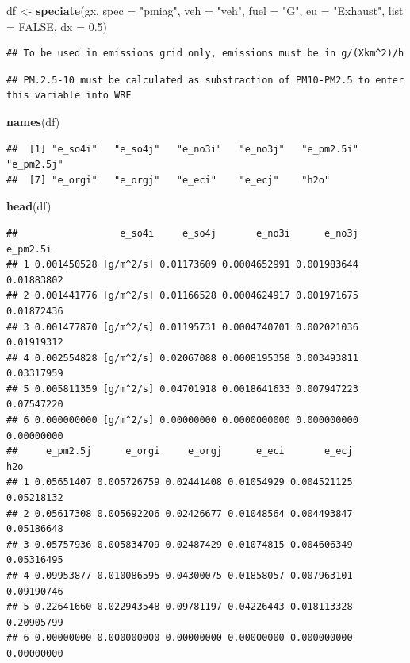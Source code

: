 \documentclass[12pt,graybox,envcountchap,sectrefs]{krantz}
\makeatletter
\newenvironment{Shaded}{\begin{snugshade}}{\end{snugshade}}
\newcommand{\KeywordTok}[1]{\textcolor[rgb]{0.13,0.29,0.53}{\textbf{#1}}}
\newcommand{\DataTypeTok}[1]{\textcolor[rgb]{0.13,0.29,0.53}{#1}}
\newcommand{\FloatTok}[1]{\textcolor[rgb]{0.00,0.00,0.81}{#1}}
\newcommand{\StringTok}[1]{\textcolor[rgb]{0.31,0.60,0.02}{#1}}
\newcommand{\OtherTok}[1]{\textcolor[rgb]{0.56,0.35,0.01}{#1}}
\newcommand{\NormalTok}[1]{#1}
\newenvironment{kframe}{%
\medskip{}
\setlength{\fboxsep}{.8em}
 \def\at@end@of@kframe{}%
 \ifinner\ifhmode%
  \def\at@end@of@kframe{\end{minipage}}%
  \begin{minipage}{\columnwidth}%
 \fi\fi%
 \def\FrameCommand##1{\hskip\@totalleftmargin \hskip-\fboxsep
 \colorbox{shadecolor}{##1}\hskip-\fboxsep
     \hskip-\linewidth \hskip-\@totalleftmargin \hskip\columnwidth}%
 \MakeFramed {\advance\hsize-\width
   \@totalleftmargin\z@ \linewidth\hsize
   \@setminipage}}%
 {\par\unskip\endMakeFramed%
 \at@end@of@kframe}
\renewenvironment{Shaded}{\begin{kframe}}{\end{kframe}}
\theoremstyle{definition}
\theoremstyle{definition}
\theoremstyle{definition}
\theoremstyle{remark}
\makeatother
\begin{document}
\begin{Shaded}
\begin{Highlighting}[]
\NormalTok{df <-}\StringTok{ }\KeywordTok{speciate}\NormalTok{(gx, }\DataTypeTok{spec =} \StringTok{"pmiag"}\NormalTok{, }\DataTypeTok{veh =} \StringTok{"veh"}\NormalTok{, }\DataTypeTok{fuel =} \StringTok{"G"}\NormalTok{,}
               \DataTypeTok{eu =} \StringTok{"Exhaust"}\NormalTok{, }\DataTypeTok{list =} \OtherTok{FALSE}\NormalTok{, }\DataTypeTok{dx =} \FloatTok{0.5}\NormalTok{)}
\end{Highlighting}
\end{Shaded}

\begin{verbatim}
## To be used in emissions grid only, emissions must be in g/(Xkm^2)/h
\end{verbatim}

\begin{verbatim}
## PM.2.5-10 must be calculated as substraction of PM10-PM2.5 to enter this variable into WRF
\end{verbatim}

\begin{Shaded}
\begin{Highlighting}[]
\KeywordTok{names}\NormalTok{(df)}
\end{Highlighting}
\end{Shaded}

\begin{verbatim}
##  [1] "e_so4i"   "e_so4j"   "e_no3i"   "e_no3j"   "e_pm2.5i" "e_pm2.5j"
##  [7] "e_orgi"   "e_orgj"   "e_eci"    "e_ecj"    "h2o"
\end{verbatim}

\begin{Shaded}
\begin{Highlighting}[]
\KeywordTok{head}\NormalTok{(df)}
\end{Highlighting}
\end{Shaded}

\begin{verbatim}
##                  e_so4i     e_so4j       e_no3i      e_no3j   e_pm2.5i
## 1 0.001450528 [g/m^2/s] 0.01173609 0.0004652991 0.001983644 0.01883802
## 2 0.001441776 [g/m^2/s] 0.01166528 0.0004624917 0.001971675 0.01872436
## 3 0.001477870 [g/m^2/s] 0.01195731 0.0004740701 0.002021036 0.01919312
## 4 0.002554828 [g/m^2/s] 0.02067088 0.0008195358 0.003493811 0.03317959
## 5 0.005811359 [g/m^2/s] 0.04701918 0.0018641633 0.007947223 0.07547220
## 6 0.000000000 [g/m^2/s] 0.00000000 0.0000000000 0.000000000 0.00000000
##     e_pm2.5j      e_orgi     e_orgj      e_eci       e_ecj        h2o
## 1 0.05651407 0.005726759 0.02441408 0.01054929 0.004521125 0.05218132
## 2 0.05617308 0.005692206 0.02426677 0.01048564 0.004493847 0.05186648
## 3 0.05757936 0.005834709 0.02487429 0.01074815 0.004606349 0.05316495
## 4 0.09953877 0.010086595 0.04300075 0.01858057 0.007963101 0.09190746
## 5 0.22641660 0.022943548 0.09781197 0.04226443 0.018113328 0.20905799
## 6 0.00000000 0.000000000 0.00000000 0.00000000 0.000000000 0.00000000
\end{verbatim}
\end{document}
